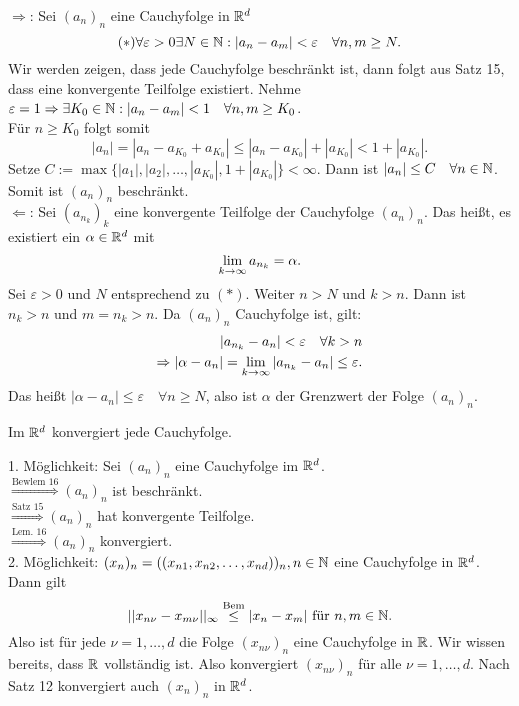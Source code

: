 \documentclass[../ana1.tex]{subfiles}
\begin{document}
\begin{bew}
	\glqq\(\Rightarrow\)\grqq: Sei \((a_n)_n\) eine Cauchyfolge in \(\mathbb{R}^d\)
	\[(*) \forall\varepsilon>0\exists N\in\mathbb{N}: |a_n - a_m|<\varepsilon \quad \forall n,m\geq N. \]
	Wir werden zeigen, dass jede Cauchyfolge beschränkt ist, dann folgt aus Satz 15, dass eine konvergente Teilfolge existiert.
	Nehme \(\varepsilon = 1 \Rightarrow \exists K_0\in\mathbb{N}: |a_n - a_m|<1 \quad \forall n,m\geq K_0\).\\
	Für \(n\geq K_0\) folgt somit \[|a_n| = |a_n - a_{K_0} + a_{K_0}| \leq |a_n - a_{K_0}| + |a_{K_0}| < 1 + |a_{K_0}|.\]
	Setze \(C:= \max \{|a_1|,|a_2|,\dots,|a_{K_0}|,1+|a_{K_0}|\}<\infty \). Dann ist \(|a_n| \leq C \quad \forall n\in\mathbb{N}\). Somit ist \({(a_n)_n}\) beschränkt.\\
	\glqq\(\Leftarrow\)\grqq: Sei \((a_{n_k})_k\) eine konvergente Teilfolge der Cauchyfolge \((a_n)_n\). Das heißt, es existiert ein \(\alpha \in\mathbb{R}^d\) mit
	\[ \lim\limits_{k\rightarrow\infty} a_{n_k} = \alpha. \]
	Sei \(\varepsilon>0\) und \(N\) entsprechend zu \((*)\). Weiter \(n>N\) und \(k>n\). Dann ist \(n_k > n\) und \(m = n_k > n\).
	Da \((a_n)_n\) Cauchyfolge ist, gilt:
	\begin{align*}
		|a_{n_k} - a_n| < \varepsilon \quad \forall k>n\\
		\Rightarrow |\alpha - a_n| = \lim\limits_{k\rightarrow\infty} |a_{n_k} - a_n| \leq \varepsilon.
	\end{align*}
	Das heißt \(|\alpha - a_n| \leq \varepsilon \quad \forall n\geq N\), also ist \(\alpha\) der Grenzwert der Folge \((a_n)_n\).
\end{bew}
\begin{satz}
	Im \(\mathbb{R}^d\) konvergiert jede Cauchyfolge.
\end{satz}
\begin{bew}
	1. Möglichkeit: Sei \((a_n)_n\) eine Cauchyfolge im \(\mathbb{R}^d\).\\
	\( \overset{\text{Bewlem 16}}{\Longrightarrow} (a_n)_n \) ist beschränkt.\\
	\( \overset{\text{Satz 15}}{\Longrightarrow} (a_n)_n\) hat konvergente Teilfolge.\\
	\( \overset{\text{Lem. 16}}{\Longrightarrow} (a_n)_n\) konvergiert.\\
	2. Möglichkeit: \((x_n)_n = ((x_{n1},x_{n2},\dots,x_{nd}))_n, n\in\mathbb{N}\) eine Cauchyfolge in \(\mathbb{R}^d\). Dann gilt
	\[ || x_{n\nu} - x_{m\nu} ||_\infty \overset{\text{Bem}}{\leq} |x_n - x_m| \text{ für } n,m\in\mathbb{N}. \]
	Also ist für jede \(\nu = 1,\dots,d\) die Folge \((x_{n\nu})_n\) eine Cauchyfolge in \(\mathbb{R}\).
	Wir wissen bereits, dass \(\mathbb{R}\) vollständig ist. Also konvergiert \((x_{n\nu})_n\) für alle \(\nu=1,\dots,d\).
	Nach Satz 12 konvergiert auch \((x_n)_n\) in \(\mathbb{R}^d\).
\end{bew}
\end{document}
